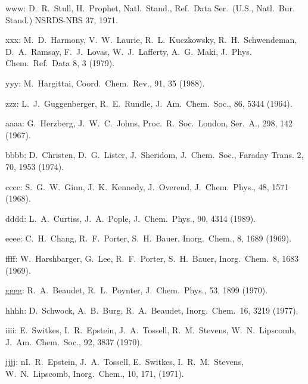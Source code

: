 \begin{description}
\item{ www: } D.\ R.\ Stull, H.\ Prophet, Natl.\ Stand., Ref.\ Data Ser.\ (U.S., Natl.\ Bur.
       Stand.) NSRDS-NBS 37, 1971.
  
\item{ xxx: } M.\ D.\ Harmony, V.\ W.\ Laurie, R.\ L.\ Kuczkowsky, R.\ H.\ Schwendeman,
       D.\ A.\ Ramsay, F.\ J.\ Lovas, W.\ J.\ Lafferty, A.\ G.\ Maki, J.\ Phys.
       Chem.\ Ref.\ Data 8, 3 (1979).
  
\item{ yyy: } M.\ Hargittai, Coord.\ Chem.\ Rev., 91, 35 (1988).
  
\item{ zzz: } L.\ J.\ Guggenberger, R.\ E.\ Rundle, J.\ Am.\ Chem.\ Soc., 86, 5344 (1964).
  
\item{aaaa: } G.\ Herzberg, J.\ W.\ C.\ Johns, Proc.\ R.\ Soc.\ London, Ser.\ A., 298, 142 (1967).
  
\item{bbbb: } D.\ Christen, D.\ G.\ Lister, J.\ Sheridom, J.\ Chem.\ Soc., Faraday Trans.
      2, 70, 1953 (1974).
  
\item{cccc: } S.\ G.\ W.\ Ginn, J.\ K.\ Kennedy, J.\ Overend, J.\ Chem.\ Phys., 48, 1571 (1968).
  
\item{dddd: } L.\ A.\ Curtiss, J.\ A.\ Pople, J.\ Chem.\ Phys., 90, 4314 (1989).
  
\item{eeee: } C.\ H.\ Chang, R.\ F.\ Porter, S.\ H.\ Bauer, Inorg.\ Chem., 8, 1689 (1969).
  
\item{ffff: } W.\ Harshbarger, G.\ Lee, R.\ F.\ Porter, S.\ H.\ Bauer, Inorg.\ Chem.\ 8, 1683
       (1969).
  
\item{gggg: } R.\ A.\ Beaudet, R.\ L.\ Poynter, J.\ Chem.\ Phys., 53, 1899 (1970).
  
\item{hhhh: } D.\ Schwock, A.\ B.\ Burg, R.\ A.\ Beaudet, Inorg.\ Chem.\ 16, 3219 (1977).
  
\item{iiii: } E.\ Switkes, I.\ R.\ Epstein, J.\ A.\ Tossell, R.\ M.\ Stevens, W.\ N.\ Lipscomb,
       J.\ Am.\ Chem.\ Soc., 92, 3837 (1970).
  
\item{jjjj: } nI.\ R.\ Epstein, J.\ A.\ Tossell, E.\ Switkes, I.\ R.\ M.\ Stevens,
       W.\ N.\ Lipscomb, Inorg.\ Chem., 10, 171, (1971).
  

\end{description}
